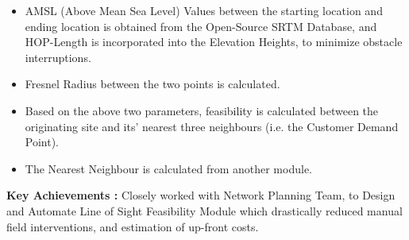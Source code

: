 \begin{itemize}
	\begin{itemize}
		\item AMSL (Above Mean Sea Level) Values between the starting location and ending location is obtained from the Open-Source SRTM Database, and HOP-Length is incorporated into the Elevation Heights, to minimize obstacle interruptions.
		
		\item Fresnel Radius between the two points is calculated.
		
		\item Based on the above two parameters, feasibility is calculated between the originating site and its’ nearest three neighbours (i.e. the Customer Demand Point).
		
		\item The Nearest Neighbour is calculated from another module.
	\end{itemize}
\end{itemize}

\textbf{Key Achievements :} Closely worked with Network Planning Team, to Design and Automate Line of Sight Feasibility Module which drastically reduced manual field interventions, and estimation of up-front costs.